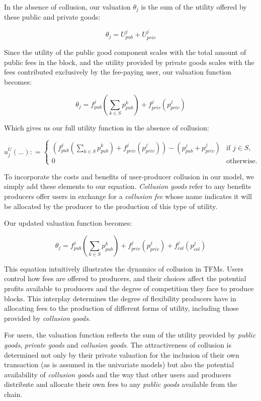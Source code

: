 \documentclass[oneside]{article}   	%
\begin{document}
In the absence of collusion, our valuation $\theta_j$ is the sum of the utility offered by these public and private goods:

$$
\theta_j = U_{pub}^j + U_{priv}^j
$$

Since the utility of the public good component scales with the total amount of public fees in the block, and the utility provided by private goods scales with the fees contributed exclusively by the fee-paying user, our valuation function becomes:

$$
\theta_j = f_{pub}^j\left(\sum_{k \in S} p_{pub}^{k}\right) + f_{priv}^j(p_{priv}^j)
$$

Which gives us our full utility function in the absence of collusion:

\[
u_j^U\left(...\right) : =
\begin{cases}
\left(
        f_{pub}^j
                \left(\sum_{k \in S} p_{pub}^{k}\right)
                + f_{priv}^j(p_{priv}^j)
\right)  -   \left(p_{pub}^j + p_{priv}^j\right) & \text{if } j \in S, \\ 0 & \text{otherwise.}
\end{cases}
\]

To incorporate the costs and benefits of user-producer collusion in our model, we simply add these elements to our equation. \textit{Collusion goods} refer to any benefits producers offer users in exchange for a \textit{collusion fee} whose name indicates it will be allocated by the producer to the production of this type of utility.

Our updated valuation function becomes:

$$
\theta_j = f_{pub}^j\left(\sum_{k \in S} p_{pub}^{k}\right) + f_{priv}^j(p_{priv}^j) + f_{col}^j(p_{col}^j)
$$

This equation intuitively illustrates the dynamics of collusion in TFMs. Users control how fees are offered to producers, and their choices affect the potential profits available to producers and the degree of competition they face to produce blocks. This interplay determines the degree of flexibility producers have in allocating fees to the production of different forms of utility, including those provided by \textit{collusion goods}.

For users, the valuation function reflects the sum of the utility provided by \textit{public goods}, \textit{private goods} and \textit{collusion goods}. The attractiveness of collusion is determined not only by their private valuation for the inclusion of their own transaction (as is assumed in the univariate models) but also the potential availability of \textit{collusion goods} and the way that other users and producers distribute and allocate their own fees to any \textit{public goods} available from the chain.
\end{document}
